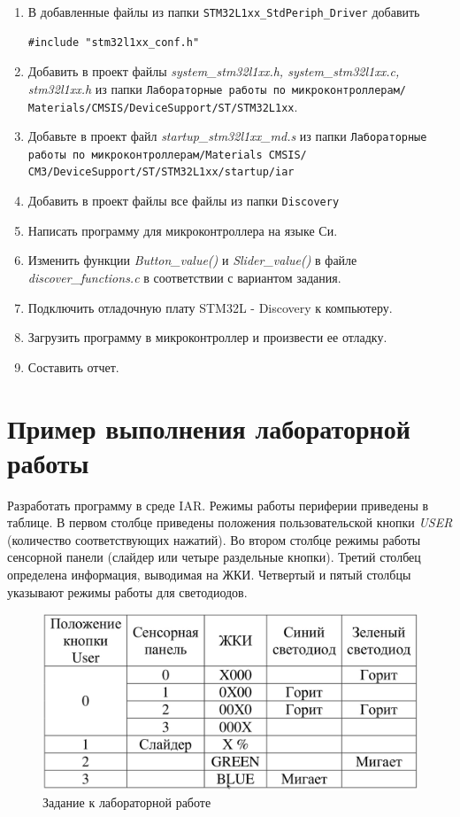 \begin{enumerate}
\item В добавленные файлы из папки \verb#STM32L1xx_StdPeriph_Driver# добавить
\begin{verbatim}
#include "stm32l1xx_conf.h"
\end{verbatim}
\item Добавить в проект файлы \textit{system\_stm32l1xx.h, system\_stm32l1xx.c, stm32l1xx.h} из папки \verb#Лабораторные работы по микроконтроллерам/#
\verb#Materials/CMSIS/DeviceSupport/ST/STM32L1xx#.
\item Добавьте в проект файл \textit{startup\_stm32l1xx\_md.s} из папки \verb#Лабораторные работы по микроконтроллерам/Materials CMSIS/#
\verb#CM3/DeviceSupport/ST/STM32L1xx/startup/iar#
\item Добавить в проект файлы все файлы из папки \verb#Discovery#
\item Написать программу для микроконтроллера на языке Си.
\item Изменить функции \textit{Button\_value()} и \textit{Slider\_value()}  в файле \textit{discover\_functions.c} в соответствии с вариантом задания.
\item Подключить отладочную плату STM32L - Discovery к компьютеру.
\item Загрузить программу в микроконтроллер и произвести ее отладку. 
\item Составить отчет.
\end{enumerate}

\section{Пример выполнения лабораторной работы }
Разработать программу в среде IAR. Режимы работы периферии приведены в таблице. В первом столбце приведены положения пользовательской кнопки \textit{USER} (количество соответствующих нажатий). Во втором столбце режимы работы сенсорной панели (слайдер или четыре раздельные кнопки). Третий столбец определена информация, выводимая на ЖКИ. Четвертый и пятый столбцы указывают режимы работы для светодиодов.

\begin{figure}[H]
\begin{center}
\includegraphics[scale=0.28]{Image/88.jpg} 
\end{center}
\caption{Задание к лабораторной работе}
\end{figure}

